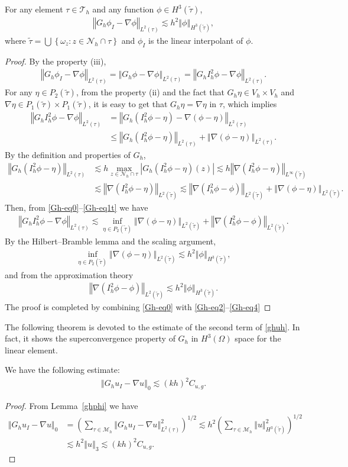 \documentclass[leqno,final]{siamltex}
\numberwithin{equation}{section}
\newcommand{\norm}[1]{\left\Vert#1\right\Vert}
\newcommand{\abs}[1]{\left\vert#1\right\vert}
\newcommand{\set}[1]{\left\{#1\right\}}
\newcommand{\nn}{\nonumber}
\newcommand{\ls}{\lesssim}
\newcommand{\na}{\nabla}
\newcommand{\om}{\omega}
\newcommand{\Om}{\Omega}
\newcommand{\M}{\mathcal{M}}
\newcommand{\N}{\mathcal{N}}
\newcommand{\T}{\mathcal{T}}
\newcommand{\eq}[1]{\begin{align}#1\end{align}}
\newcommand{\eqn}[1]{\begin{align*}#1\end{align*}}
\begin{document}
\begin{lemma}\label{ghphi}
For any element $\tau\in\T_h$ and any function $\phi\in H^3(\tilde\tau)$,
\eq{ \norm{G_h\phi_I-\na \phi}_{L^2(\tau)}\ls h^2\norm{\phi}_{H^3(\tilde\tau)}, }
where $\tilde\tau=\bigcup\set{\om_z:z\in\N_h\cap\tau}$ and $\phi_I$ is the linear interpolant of $\phi$.
\end{lemma}
\begin{proof}
By the property (iii),
\eq{ \norm{G_h\phi_I-\na \phi}_{L^2(\tau)} = \norm{G_h\phi-\na \phi}_{L^2(\tau)}=\norm{G_hI_h^2\phi-\na \phi}_{L^2(\tau)}. \label{Gh-eq0} }
For any $\eta\in P_{2}(\tilde\tau)$, from the property (ii) and the fact that $G_h\eta\in V_h\times V_h$ and
$\na\eta\in P_1(\tilde\tau)\times P_1(\tilde\tau)$, it is easy to get that $G_h\eta=\na\eta$ in $\tau$, which implies
\eq{ \norm{G_hI_h^2\phi-\na \phi}_{L^2(\tau)} &= \norm{G_h(I_h^2\phi-\eta)-\na (\phi-\eta)}_{L^2(\tau)} \label{Gh-eq1}\\
&\leq \norm{G_h(I_h^2\phi-\eta)}_{L^2(\tau)}+\norm{\na (\phi-\eta)}_{L^2(\tau)}.\nn }
By the definition and properties of $G_h$,
\eq{ \norm{G_h(I_h^2\phi-\eta)}_{L^2(\tau)} &\ls h \max_{z\in \N_h\cap\tau} \abs{G_h(I_h^2\phi-\eta)(z)} \ls
h \norm{\na(I_h^2\phi-\eta)}_{L^\infty(\tilde\tau)} \label{Gh-eq1t}\\
& \ls \norm{\na(I_h^2\phi-\eta)}_{L^2(\tilde\tau)} \ls  \norm{\na(I_h^2\phi-\phi)}_{L^2(\tilde\tau)} + \norm{\na(\phi-\eta)}_{L^2(\tilde\tau)}.\nn }
Then, from \eqref{Gh-eq0}--\eqref{Gh-eq1t} we have
\eq{\label{Gh-eq2} \norm{G_hI_h^2\phi-\na \phi}_{L^2(\tau)} \ls \inf_{\eta\in P_2(\tilde\tau)} \norm{\na (\phi-\eta)}_{L^2(\tilde\tau)} +
\norm{\na(I_h^2\phi-\phi)}_{L^2(\tilde\tau)}. }
By {the} Hilbert--Bramble lemma and the scaling argument,
\eq{\label{Gh-eq3} \inf_{\eta\in P_2(\tilde\tau)}\norm{\na (\phi-\eta)}_{L^2(\tilde\tau)} \ls h^2\norm{\phi}_{H^3(\tilde\tau)}, }
and from the approximation theory
\eq{\label{Gh-eq4} \norm{\na(I_h^2\phi-\phi)}_{L^2(\tilde\tau)}\ls h^2 \norm{\phi}_{H^3(\tilde\tau)}. }
The proof is completed by combining \eqref{Gh-eq0} {with} \eqref{Gh-eq2}--\eqref{Gh-eq4}
\end{proof}

The following theorem is devoted to the estimate of the second term of \eqref{ghuh}. In fact, it
shows the superconvergence property of $G_h$ in $H^3(\Om)$ space for the linear element.
\begin{theorem} \label{main0}
We have the following estimate:
\eq{ \norm{G_hu_I-\na u}_0\ls (kh)^2  C_{u,g}. \label{eq:th0eq1} }
\end{theorem}
\begin{proof} From Lemma~\ref{ghphi} we have
\eqn{ \norm{G_hu_I-\na u}_0 &= \left(\sum_{\tau\in\M_h}\norm{G_hu_I-\na u}^2_{L^2(\tau)}\right)^{1/2} \ls h^2 \left(\sum_{\tau\in\M_h}\norm{u}^2_{H^3(\tilde\tau)}\right)^{1/2}  \\
&\ls h^2 \norm{u}_3 \ls (kh)^2 C_{u,g}. }
\end{proof}
\end{document}
